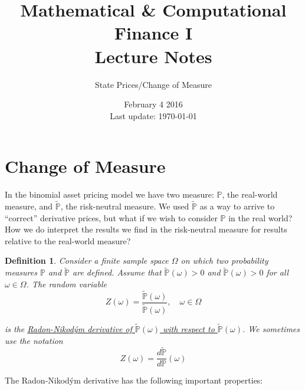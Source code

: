 \documentclass[12pt]{article}
\newtheorem{definition}{Definition}
\newlength\tindent
\renewcommand{\indent}{\hspace*{\tindent}}
\renewcommand{\P}{\mathbb P}
\begin{document}
 
 
\title{Mathematical \& Computational Finance I\\Lecture Notes}
\author{State Prices/Change of Measure}
\date{February 4 2016 \\ Last update: \today{}}
\maketitle

\section{Change of Measure}

\indent In the binomial asset pricing model we have two measure: $\P$, the real-world measure, and $\tilde{\P}$, the risk-neutral measure. We used $\tilde{\P}$ as a way to arrive to ``correct'' derivative prices, but what if we wish to consider $\P$ in the real world? How we do interpret the results we find in the risk-neutral measure for results relative to the real-world measure? \\

\begin{definition} Consider a finite sample space $\Omega$ on which two probability measures $\P$ and $\tilde{\P}$ are defined. Assume that $\tilde{\P}(\omega) > 0$ and $\tilde{\P}(\omega) > 0$ for all $\omega \in \Omega$. The random variable
\begin{equation*}
	Z(\omega) = \frac{ \tilde{\P}(\omega) }{ \tilde{\P}(\omega) }, \quad \omega \in \Omega
\end{equation*}

is the \underline{Radon-Nikod\'{y}m derivative of $\tilde{\P}(\omega)$ with respect to $\tilde{\P}(\omega)$}. We sometimes use the notation
\begin{equation*}
	Z(\omega) = \frac{ d\tilde{\P} }{ d\P }(\omega)
\end{equation*}
\end{definition}

The Radon-Nikod\'{y}m derivative has the following important properties:
\end{document}
